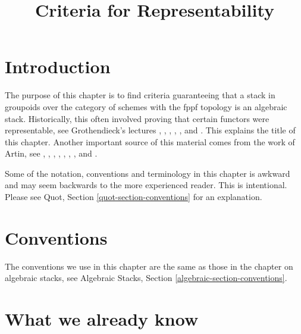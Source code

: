 \documentclass{stacks-project}
\theoremstyle{plain}
\theoremstyle{definition}
\theoremstyle{remark}
\numberwithin{equation}{subsection}
\begin{document}
\title{Criteria for Representability}

\maketitle

\label{section-phantom}

\tableofcontents




\section{Introduction}
\label{section-introduction}

\noindent
The purpose of this chapter is to find criteria guaranteeing that a
stack in groupoids over the category of schemes with the fppf topology
is an algebraic stack. Historically, this often involved proving that
certain functors were representable, see Grothendieck's lectures
\cite{Gr-I},
\cite{Gr-II},
\cite{Gr-III},
\cite{Gr-IV},
\cite{Gr-V}, and
\cite{Gr-VI}.
This explains the title of this chapter. Another important source
of this material comes from the work of Artin, see
\cite{ArtinI},
\cite{ArtinII},
\cite{Artin-Theorem-Representability},
\cite{Artin-Construction-Techniques},
\cite{Artin-Algebraic-Spaces},
\cite{Artin-Algebraic-Approximation},
\cite{Artin-Implicit-Function}, and
\cite{ArtinVersal}.

\medskip\noindent
Some of the notation, conventions and terminology in this chapter is awkward
and may seem backwards to the more experienced reader. This is intentional.
Please see Quot, Section \ref{quot-section-conventions} for an
explanation.



\section{Conventions}
\label{section-conventions}

\noindent
The conventions we use in this chapter are the same as those in the
chapter on algebraic stacks, see
Algebraic Stacks, Section \ref{algebraic-section-conventions}.




\section{What we already know}
\label{section-done-so-far}
\end{document}
